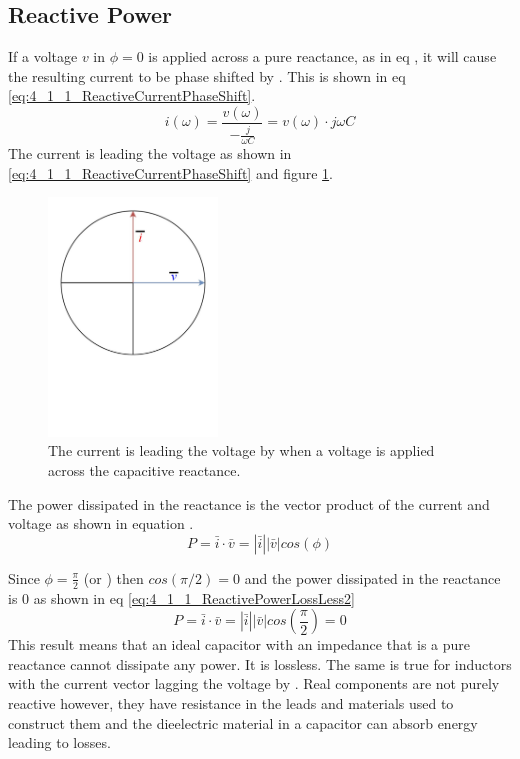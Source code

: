 \subsection{Reactive Power} \label{subsec:ReactivePower}
If a voltage $v$ in $\phi = 0$ is applied across a pure reactance, as in eq , it will cause the resulting current to be phase shifted by . This is shown in eq \ref{eq:4_1_1_ReactiveCurrentPhaseShift}. 
\begin{equation}\label{eq:4_1_1_ReactiveCurrentPhaseShift}
    i(\omega) = \frac{v(\omega)}{-\frac{j}{\omega C}} = v(\omega) \cdot j \omega C 
\end{equation}
The current is leading the voltage as shown in \ref{eq:4_1_1_ReactiveCurrentPhaseShift} and figure \ref{fig:4_1_1_ReactanceCurrentLeadVoltage}.
\begin{figure}[H]
    \centering
    \includegraphics[clip, trim=0 250 0 0, width=0.4\textwidth]{Sections/4_TechnicalAnalysis/Figures/4_1_1_ReactanceCurrentPhase.pdf}
    \caption{The current is leading the voltage by  when a voltage is applied across the capacitive reactance.}
    \label{fig:4_1_1_ReactanceCurrentLeadVoltage}
\end{figure}

The power dissipated in the reactance is the vector product of the current and voltage as shown in equation .
\begin{equation}\label{eq:4_1_1_ReactivePowerLossLess}
    P = \bar i \cdot \bar v = |\bar i| |\bar v| cos(\phi)
\end{equation}

Since $\phi = \frac{\pi}{2}$ (or ) then $cos(\pi/2) = 0$ and the power dissipated in the reactance is 0 as shown in eq \ref{eq:4_1_1_ReactivePowerLossLess2}
\begin{equation}\label{eq:4_1_1_ReactivePowerLossLess2}
    P = \bar i \cdot \bar v = |\bar i| |\bar v| cos\left(\frac{\pi}{2}\right) = 0
\end{equation}
This result means that an ideal capacitor with an impedance that is a pure reactance cannot dissipate any power. It is lossless. The same is true for inductors with the current vector lagging the voltage by . Real components are not purely reactive however, they have resistance in the leads and materials used to construct them and the dieelectric material in a capacitor can absorb energy leading to losses. 
